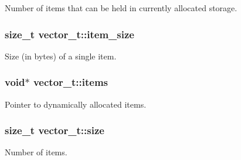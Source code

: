 \-Number of items that can be held in currently allocated storage. 

\hypertarget{structvector__t_a38dfa6c7c9cf7afb483b07cb168461c9}{
\subsubsection[{item\-\_\-size}]{\setlength{\rightskip}{0pt plus 5cm}size\-\_\-t {\bf vector\-\_\-t\-::item\-\_\-size}}}
\label{structvector__t_a38dfa6c7c9cf7afb483b07cb168461c9}


\-Size (in bytes) of a single item. 

\hypertarget{structvector__t_a083c597f2ae3b6302b26ba9e6330ee5f}{
\subsubsection[{items}]{\setlength{\rightskip}{0pt plus 5cm}void$\ast$ {\bf vector\-\_\-t\-::items}}}
\label{structvector__t_a083c597f2ae3b6302b26ba9e6330ee5f}


\-Pointer to dynamically allocated items. 

\hypertarget{structvector__t_a7ec97862387465722f8f08f8f8f69371}{
\subsubsection[{size}]{\setlength{\rightskip}{0pt plus 5cm}size\-\_\-t {\bf vector\-\_\-t\-::size}}}
\label{structvector__t_a7ec97862387465722f8f08f8f8f69371}


\-Number of items. 

